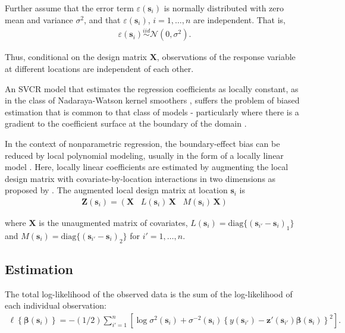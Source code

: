 \documentclass[authoryear, review, 11pt]{elsarticle}
\begin{document}
	Further assume that the error term $\varepsilon(\bm{s}_i)$ is normally distributed with zero mean and variance $\sigma^2$, and that $\varepsilon(\bm{s}_i)$, $i=1, \dots, n$ are independent. That is,
	\begin{align} \label{eq:err}
		\varepsilon(\bm{s}_i) \overset{iid}{\sim} \mathcal{N} \left( 0,\sigma^2 \right).
	\end{align}
	
    Thus, conditional on the design matrix $\bm{X}$, observations of the response variable at different locations are independent of each other.
  
    An SVCR model that estimates the regression coefficients as locally constant, as in the class of Nadaraya-Watson kernel smoothers \citep{Hardle-1990}, suffers the problem of biased estimation that is common to that class of models - particularly where there is a gradient to the coefficient surface at the boundary of the domain \citep{Hastie:1993b}.

    In the context of nonparametric regression, the boundary-effect bias can be reduced by local polynomial modeling, usually in the form of a locally linear model \citep{Fan-1996}. Here, locally linear coefficients are estimated by augmenting the local design matrix with covariate-by-location interactions in two dimensions as proposed by \cite{Wang:2008b}. The augmented local design matrix at location $\bm{s}_i$ is
    \begin{align}
        \bm{Z}(\bm{s}_i) = \left( \bm{X}  \;\;\; L(\bm{s}_i) \, \bm{X} \;\;\; M(\bm{s}_i) \, \bm{X} \right)
    \end{align} 
  
    where $\bm{X}$ is the unaugmented matrix of covariates, $L(\bm{s}_i) = \text{diag}\{ ( \bm{s}_{i'} - \bm{s}_{i} )_1 \}$ and $M(\bm{s}_i) = \text{diag}\{ ( \bm{s}_{i'} - \bm{s}_{i} )_2 \}$ for $i' = 1, \dots, n$.
  
    \subsection{Estimation}		
    The total log-likelihood of the observed data is the sum of the log-likelihood of each individual observation:
    \begin{align} \label{eq:coefficients}
  	    \ell \left\{ \bm{\beta}(\bm{s}_i) \right\} = -(1/2) \sum_{i'=1}^n \left[ \log{\sigma^2(\bm{s}_i)}  + \sigma^{-2}(\bm{s}_i)  \left\{ y(\bm{s}_{i'}) - \bm{z}'(\bm{s}_{i'}) \bm{\beta}(\bm{s}_i) \right\}^2 \right].
    \end{align}
	
\end{document}
